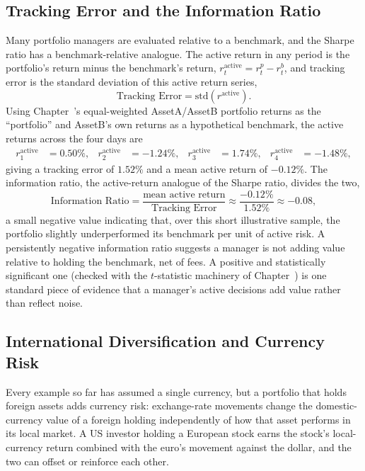 \documentclass[../ai_in_finance]{subfiles}
\begin{document}
\subsection{Tracking Error and the Information Ratio}
\label{sec:tracking-error}

Many portfolio managers are evaluated relative to a benchmark, and the Sharpe ratio has a benchmark-relative analogue. The active return in any period is the portfolio's return minus the benchmark's return, $r_t^{\text{active}} = r_t^p - r_t^b$, and tracking error is the standard deviation of this active return series,
\begin{equation*}
\text{Tracking Error} = \text{std}(r^{\text{active}}).
\end{equation*}
Using Chapter~'s equal-weighted AssetA/AssetB portfolio returns as the ``portfolio'' and AssetB's own returns as a hypothetical benchmark, the active returns across the four days are
\begin{align*}
r_1^{\text{active}} &= 0.50\%, & r_2^{\text{active}} &= -1.24\%, & r_3^{\text{active}} &= 1.74\%, & r_4^{\text{active}} &= -1.48\%,
\end{align*}
giving a tracking error of $1.52\%$ and a mean active return of $-0.12\%$. The information ratio, the active-return analogue of the Sharpe ratio, divides the two,
\begin{equation*}
\text{Information Ratio} = \frac{\text{mean active return}}{\text{Tracking Error}} \approx \frac{-0.12\%}{1.52\%} \approx -0.08,
\end{equation*}
a small negative value indicating that, over this short illustrative sample, the portfolio slightly underperformed its benchmark per unit of active risk. A persistently negative information ratio suggests a manager is not adding value relative to holding the benchmark, net of fees. A positive and statistically significant one (checked with the $t$-statistic machinery of Chapter~) is one standard piece of evidence that a manager's active decisions add value rather than reflect noise.

\subsection{International Diversification and Currency Risk}
\label{sec:international-diversification}

Every example so far has assumed a single currency, but a portfolio that holds foreign assets adds currency risk: exchange-rate movements change the domestic-currency value of a foreign holding independently of how that asset performs in its local market.
A US investor holding a European stock earns the stock's local-currency return combined with the euro's movement against the dollar, and the two can offset or reinforce each other.
\end{document}
